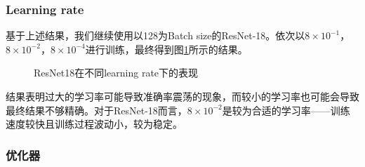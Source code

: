 \documentclass{article}
\theoremstyle{definition}
\begin{document}
\subsubsection{Learning rate}
基于上述结果，我们继续使用以128为Batch size的ResNet-18。依次以$8\times10^{-1}$，$8\times10^{-2}$，$8\times10^{-4}$进行训练，最终得到图\ref{fig:resnet18_lr}所示的结果。
\begin{figure}[H]
	\centering
	\caption{ResNet18在不同learning rate下的表现}
	\label{fig:resnet18_lr}
\end{figure}
结果表明过大的学习率可能导致准确率震荡的现象，而较小的学习率也可能会导致最终结果不够精确。对于ResNet-18而言，$8\times10^{-2}$是较为合适的学习率——训练速度较快且训练过程波动小，较为稳定。
\subsubsection{优化器}
\end{document}
